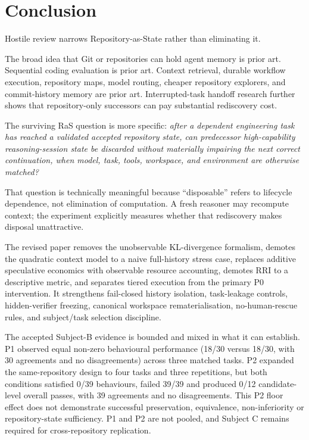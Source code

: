 \section{Conclusion}
\label{sec:conclusion}

Hostile review narrows Repository-as-State rather than eliminating it.

The broad idea that Git or repositories can hold agent memory is prior art. Sequential coding evaluation is prior art. Context retrieval, durable workflow execution, repository maps, model routing, cheaper repository explorers, and commit-history memory are prior art. Interrupted-task handoff research further shows that repository-only successors can pay substantial rediscovery cost.

The surviving RaS question is more specific: \emph{after a dependent engineering task has reached a validated accepted repository state, can predecessor high-capability reasoning-session state be discarded without materially impairing the next correct continuation, when model, task, tools, workspace, and environment are otherwise matched?}

That question is technically meaningful because “disposable” refers to lifecycle dependence, not elimination of computation. A fresh reasoner may recompute context; the experiment explicitly measures whether that rediscovery makes disposal unattractive.

The revised paper removes the unobservable KL-divergence formalism, demotes the quadratic context model to a naive full-history stress case, replaces additive speculative economics with observable resource accounting, demotes RRI to a descriptive metric, and separates tiered execution from the primary P0 intervention. It strengthens fail-closed history isolation, task-leakage controls, hidden-verifier freezing, canonical workspace rematerialisation, no-human-rescue rules, and subject/task selection discipline.

The accepted Subject-B evidence is bounded and mixed in what it can establish. P1 observed equal non-zero behavioural performance (18/30 versus 18/30, with 30 agreements and no disagreements) across three matched tasks. P2 expanded the same-repository design to four tasks and three repetitions, but both conditions satisfied 0/39 behaviours, failed 39/39 and produced 0/12 candidate-level overall passes, with 39 agreements and no disagreements. This P2 floor effect does not demonstrate successful preservation, equivalence, non-inferiority or repository-state sufficiency. P1 and P2 are not pooled, and Subject C remains required for cross-repository replication.

